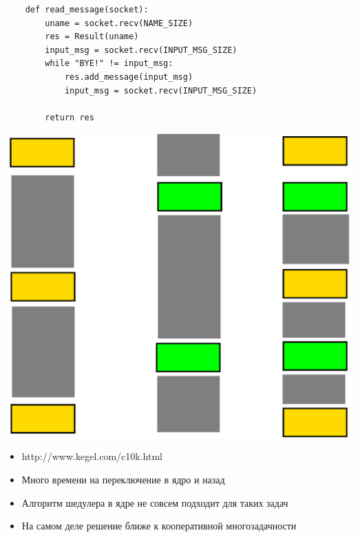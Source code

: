 \documentclass{article}
\begin{document}
\LARGE


{
\LARGE \vspace{15pt}
\begin{lstlisting}
	def read_message(socket):
		uname = socket.recv(NAME_SIZE)
		res = Result(uname)
		input_msg = socket.recv(INPUT_MSG_SIZE)
		while "BYE!" != input_msg:
			res.add_message(input_msg)
			input_msg = socket.recv(INPUT_MSG_SIZE)

		return res
\end{lstlisting}
}

\newpage

\includegraphics[scale=0.4]{images/threads.pdf}
\newpage
\begin{itemize}
\item http://www.kegel.com/c10k.html
\item Много времени на переключение в ядро и назад
\item Алгоритм шедулера в ядре не совсем подходит для таких задач
\item На самом деле решение ближе к кооперативной многозадачности
\end{itemize}
\end{document}
